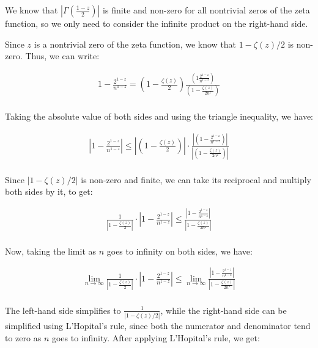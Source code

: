 \documentclass{article}
\begin{document}
We know that $|\Gamma\left(\frac{1-z}{2}\right)|$ is finite and non-zero for all nontrivial zeros of the zeta function, so we only need to consider the infinite product on the right-hand side.

Since $z$ is a nontrivial zero of the zeta function, we know that $1 - \zeta(z)/2$ is non-zero. Thus, we can write:

\begin{align*}
1 - \frac{2^{1-z}}{n^{1-z}} = \left(1 - \frac{\zeta(z)}{2}\right) \frac{\left(1\frac{2^{1-z}}{n^{1-z}}\right)}{\left(1 - \frac{\zeta(z)}{2n^{z}}\right)} \\
\end{align*}

Taking the absolute value of both sides and using the triangle inequality, we have:

\begin{align*}
\left|1 - \frac{2^{1-z}}{n^{1-z}}\right| \leq \left|\left(1 - \frac{\zeta(z)}{2}\right)\right| \cdot \frac{\left|\left(1 - \frac{2^{1-z}}{n^{1-z}}\right)\right|}{\left|\left(1 - \frac{\zeta(z)}{2n^{z}}\right)\right|} \\
\end{align*}

Since $|1 - \zeta(z)/2|$ is non-zero and finite, we can take its reciprocal and multiply both sides by it, to get:

\begin{align*}
\frac{1}{\left|1 - \frac{\zeta(z)}{2}\right|} \cdot \left|1 - \frac{2^{1-z}}{n^{1-z}}\right| \leq \frac{\left|1 - \frac{2^{1-z}}{n^{1-z}}\right|}{\left|1 - \frac{\zeta(z)}{2n^{z}}\right|} \\
\end{align*}

Now, taking the limit as $n$ goes to infinity on both sides, we have:

\begin{align*}
\lim_{n \to \infty} \frac{1}{\left|1 - \frac{\zeta(z)}{2}\right|} \cdot \left|1 - \frac{2^{1-z}}{n^{1-z}}\right| \leq \lim_{n \to \infty} \frac{\left|1 - \frac{2^{1-z}}{n^{1-z}}\right|}{\left|1 - \frac{\zeta(z)}{2n^{z}}\right|} \\
\end{align*}

The left-hand side simplifies to $\frac{1}{|1 - \zeta(z)/2|}$, while the right-hand side can be simplified using L'Hopital's rule, since both the numerator and denominator tend to zero as $n$ goes to infinity. After applying L'Hopital's rule, we get:
\end{document}
